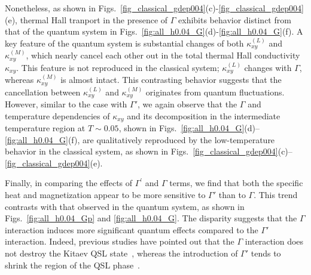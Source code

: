 \documentclass[twocolumn,superscriptaddress,showpacs, longbibliography, aps, prx]{revtex4-2}
\begin{document}
Nonetheless, as shown in Figs.~\ref{fig_classical_gdep004}(c)-\ref{fig_classical_gdep004}(e), thermal Hall tranport in the presence of $\Gamma$ exhibits behavior distinct from that of the quantum system in Figs.~\ref{fig:all_h0.04_G}(d)-\ref{fig:all_h0.04_G}(f).
A key feature of the quantum system is substantial changes of both $\kappa_{xy}^{(L)}$ and $\kappa_{xy}^{(M)}$, which nearly cancel each other out in the total thermal Hall conductivity $\kappa_{xy}$.
This feature is not reproduced in the classical system; $\kappa_{xy}^{(L)}$ changes with $\Gamma$, whereas $\kappa_{xy}^{(M)}$ is almost intact. 
This contrasting behavior suggests that the cancellation between $\kappa_{xy}^{(L)}$ and $\kappa_{xy}^{(M)}$ originates from quantum fluctuations.
However, similar to the case with $\Gamma'$, we again observe that the $\Gamma$ and temperature dependencies of $\kappa_{xy}$ and its decomposition in the intermediate temperature region at $T \sim0.05$, shown in Figs.~\ref{fig:all_h0.04_G}(d)--\ref{fig:all_h0.04_G}(f), are qualitatively reproduced by the low-temperature behavior in the classical system, as shown in Figs.~\ref{fig_classical_gdep004}(c)--\ref{fig_classical_gdep004}(e).

Finally, in comparing the effects of $\Gamma^{\prime}$ and $\Gamma$ terms, we find that both the specific heat and magnetization appear to be more sensitive to $\Gamma'$ than to $\Gamma$. 
This trend contrasts with that observed in the quantum system, as shown in Figs.~\ref{fig:all_h0.04_Gp} and \ref{fig:all_h0.04_G}.
The disparity suggests that the $\Gamma$ interaction induces more significant quantum effects compared to
the $\Gamma'$ interaction.
Indeed, previous studies have pointed out that the $\Gamma$ interaction does not destroy the Kitaev QSL state~\cite{Gohlke_PRB2018,catuneanu2018}, whereas the introduction of $\Gamma'$ tends to shrink the region of the QSL phase~\cite{gordon2019theory,Luo2022}.
\end{document}
